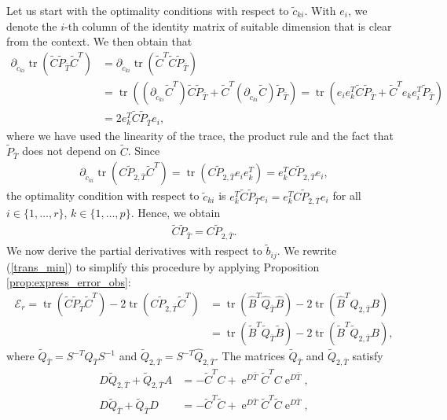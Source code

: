 \documentclass[a4paper,11pt, twoside]{article}
\newcommand{\expn}{\operatorname{e}}
\newcommand{\trace}{\operatorname{tr}}
\begin{document}
Let us start with the optimality conditions with respect to $\tilde c_{ki}$. With $e_i$, we denote the $i$-th column of the identity matrix of 
suitable dimension that is clear from the context. We then obtain that \begin{align*}
        \partial_{\tilde c_{ki}} \trace(\tilde C \tilde P_{\bar T} \tilde C^T) &=   \partial_{\tilde c_{ki}} \trace(\tilde C^T\tilde C \tilde P_{\bar T})\\
        &= \trace((\partial_{\tilde c_{ki}}\tilde C^T)\tilde C \tilde P_{\bar 
T}+\tilde C^T (\partial_{\tilde c_{ki}}\tilde C) \tilde P_{\bar T})=\trace(e_ie_k^T\tilde C \tilde P_{\bar T}+\tilde C^T e_k e_i^T \tilde 
P_{\bar T})\\
&=2 e_k^T\tilde C \tilde P_{\bar T}e_i,
                                                                                                                 \end{align*}
where we have used the linearity of the trace, the product rule and the fact that $\tilde P_{\bar T}$ does not depend on $\tilde C$. Since 
\begin{align*}
\partial_{\tilde c_{ki}} \trace(C \tilde P_{2, \bar T} \tilde C^T)=\trace(C \tilde P_{2, \bar T} e_ie_k^T)= e_k^T C \tilde P_{2, \bar T} e_i,
\end{align*}
the optimality condition with respect to $\tilde c_{ki}$ is $e_k^T \tilde C \tilde P_{\bar T} e_i=e_k^T C \tilde P_{2, \bar T} e_i$ for all $i \in 
\{1,\ldots,r\}$,  $k \in \{1,\ldots,p\}$. 
Hence, we obtain \begin{align}\label{opt1}
  \tilde C \tilde P_{\bar T} = C \tilde P_{2, \bar T}.               
                 \end{align}
We now derive the partial derivatives with respect to $\tilde b_{ij}$. We rewrite (\ref{trans_min}) to simplify this procedure by applying Proposition 
\ref{prop:express_error_obs}: \begin{align*}
      \mathcal E_r = \trace(\tilde C \tilde P_{\bar T} \tilde C^T) - 2 \trace(C \tilde P_{2, \bar T}  \tilde C^T)&= \trace(\hat B^T \hat Q_{\bar T} \hat B)-2 
\trace(\hat B^T Q_{2, \bar T} B)\\&= \trace(\tilde B^T \tilde Q_{\bar T} \tilde B)-2 \trace(\tilde B^T \tilde Q_{2, \bar T} B),
                              \end{align*}
where $\tilde Q_{\bar T}=S^{-T}\hat Q_{\bar T}S^{-1}$ and $\tilde Q_{2, \bar T}=S^{-T}\hat Q_{2, \bar T}$. The matrices $\tilde Q_{\bar T}$ and 
$\tilde Q_{2, \bar T}$ satisfy \begin{align}\label{trans_cross_obs}
D \tilde Q_{2, {\bar T}}+ \tilde Q_{2, {\bar T}} A &=-\tilde C^T C+\expn^{D \bar T} \tilde C^T C \expn^{D \bar T}, \\ 
\label{trans_reduced_obs}
D \tilde Q_{\bar T}+\tilde Q_{\bar T} D &=-\tilde C^T \tilde C+\expn^{D \bar T}\tilde C^T \tilde C \expn^{D \bar T},
                                          \end{align}
\end{document}
